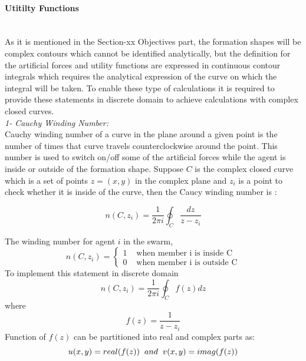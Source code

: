 \documentclass[twoside]{article}
\begin{document}
     \paragraph{Utitilty Functions}\hspace{0pt} \\
		As it is mentioned in the Section-xx Objectives part, the formation shapes will be complex contours which cannot be identified analytically, but the definition for the artificial forces and utility functions are expressed in continuous contour integrals which requires the analytical expression of the curve on which the integral will be taken. To enable these type of calculations it is required to provide these statements in discrete domain to achieve calculations with complex closed curves. \\ \newline
\textit{ 		1- Cauchy Winding Number:} \\ 
		Cauchy winding number of a curve in the plane around a given point is the number of times that curve travels counterclockwise around the point. This number is used to switch on/off some of the artificial forces while the agent is inside or outside of the formation shape. Suppose $C$ is the complex closed curve which is a set of points $z=(x,y)$ in the complex plane  and $z_i$ is a point to check whether it is inside of the curve, then the Caucy winding number is :
					
		\begin{equation}
 n(C,z_i) = \frac{1}{2\pi i}\oint_C \frac{dz}{z-z_i}
 		\end{equation}
		
		The winding number for agent $i$ in the swarm,
\begin{equation}
n(C,z_i) = \left\{ \begin{array}{rl}
1 &\mbox{ when member i is inside C} \\
0 &\mbox{ when member i is outside C}
\end{array} \right.
\end{equation}
		To implement this statement in discrete domain 
		\begin{equation}
n(C,z_i) = \frac{1}{2\pi i} \oint_C f(z)dz
		\end{equation}
		where 
		\begin{equation}
f(z) = \frac{1}{z-z_i}
		\end{equation}
		Function of $f(z)$ can be partitioned into real and complex parts as:
		\begin{equation}
u(x,y) = real(f(z))  \hspace{0.2cm} and \hspace{0.2cm} v(x,y) = imag(f(z))
		\end{equation}
		
\end{document}
